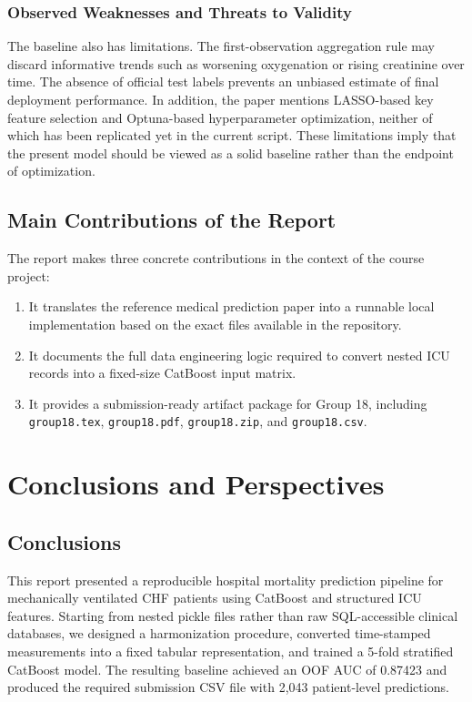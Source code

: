 \documentclass[a4paper,12pt]{extreport}
\begin{document}
\subsection{Observed Weaknesses and Threats to Validity}
The baseline also has limitations. The first-observation aggregation rule may discard informative trends such as worsening oxygenation or rising creatinine over time. The absence of official test labels prevents an unbiased estimate of final deployment performance. In addition, the paper mentions LASSO-based key feature selection and Optuna-based hyperparameter optimization, neither of which has been replicated yet in the current script. These limitations imply that the present model should be viewed as a solid baseline rather than the endpoint of optimization.

\section{Main Contributions of the Report}
The report makes three concrete contributions in the context of the course project:
\begin{enumerate}[leftmargin=1.7em]
    \item It translates the reference medical prediction paper into a runnable local implementation based on the exact files available in the repository.
    \item It documents the full data engineering logic required to convert nested ICU records into a fixed-size CatBoost input matrix.
    \item It provides a submission-ready artifact package for Group 18, including \texttt{group18.tex}, \texttt{group18.pdf}, \texttt{group18.zip}, and \texttt{group18.csv}.
\end{enumerate}

\chapter{Conclusions and Perspectives}

\section{Conclusions}
This report presented a reproducible hospital mortality prediction pipeline for mechanically ventilated CHF patients using CatBoost and structured ICU features. Starting from nested pickle files rather than raw SQL-accessible clinical databases, we designed a harmonization procedure, converted time-stamped measurements into a fixed tabular representation, and trained a 5-fold stratified CatBoost model. The resulting baseline achieved an OOF AUC of 0.87423 and produced the required submission CSV file with 2{,}043 patient-level predictions.
\end{document}
